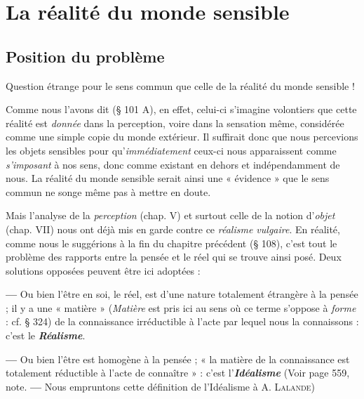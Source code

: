 \chapter{La réalité du monde sensible}
\addtocounter{chapitre}{1}

\section{Position du problème}%
Question étrange pour le sens commun que celle de la réalité du monde sensible !

Comme nous l’avons dit (§ 101 A), en effet, celui-ci s’imagine volontiers
que cette réalité est {\it donnée} dans la perception, voire dans la
sensation même, considérée comme une simple copie du monde
extérieur. Il suffirait donc que nous percevions les objets sensibles
pour qu'{\it immédiatement} ceux-ci nous apparaissent comme {\it s'imposant}
à nos sens, donc comme existant en dehors et indépendamment de
nous. La réalité du monde sensible serait ainsi une « évidence » que
le sens commun ne songe même pas à mettre en doute.

Mais l’analyse de la {\it perception} (chap. V) et surtout celle de la
notion d’{\it objet} (chap. VII) nous ont déjà mis en garde contre ce
{\it réalisme vulgaire}. En réalité, comme nous le suggérions à la fin du
chapitre précédent (§ 108), c’est tout le problème des rapports entre
la pensée et le réel qui se trouve ainsi posé. Deux solutions opposées
peuvent être ici adoptées :

{\bf —} Ou bien l’être en soi, le réel, est d’une nature totalement étrangère
à la pensée ; il y a une « matière »
{\scriptsize ({\it Matière} est pris ici au sens où ce
terme s'oppose à {\it forme} : cf. § 324)}
de la connaissance irréductible
à l’acte par lequel nous la connaissons : c’est le \textbf{\textit {Réalisme}}.

{\bf —} Ou bien l’être est homogène à la pensée ; « la matière de la connaissance
est totalement réductible à l’acte de connaître » : c’est l’\textbf{\textit {Idéalisme}}
{\scriptsize (Voir page 559, note. {\bf —} Nous empruntons cette définition de l’Idéalisme à
A. \textsc{Lalande})}

